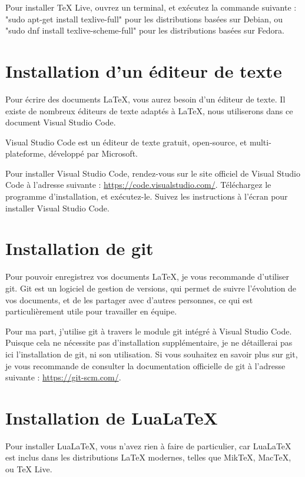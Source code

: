 \documentclass[./main.tex]{subfiles}
\begin{document}
Pour installer TeX Live, ouvrez un terminal, et exécutez la commande suivante :
"sudo apt-get install texlive-full" pour les distributions basées sur Debian, ou "sudo dnf install texlive-scheme-full" pour les distributions basées sur Fedora.

\section{Installation d'un éditeur de texte}

Pour écrire des documents \LaTeX{}, vous aurez besoin d'un éditeur de texte. Il existe de nombreux éditeurs de texte adaptés à \LaTeX{}, nous utiliserons dans ce document Visual Studio Code.

Visual Studio Code est un éditeur de texte gratuit, open-source, et multi-plateforme, développé par Microsoft.

Pour installer Visual Studio Code, rendez-vous sur le site officiel de Visual Studio Code à l'adresse suivante : \url{https://code.visualstudio.com/}. Téléchargez le programme d'installation, et exécutez-le. Suivez les instructions à l'écran pour installer Visual Studio Code.

\section{Installation de git}

Pour pouvoir enregistrez vos documents \LaTeX{}, je vous recommande d'utiliser git. Git est un logiciel de gestion de versions, qui permet de suivre l'évolution de vos documents, et de les partager avec d'autres personnes, ce qui est particulièrement utile pour travailler en équipe.

Pour ma part, j'utilise git à travers le module git intégré à Visual Studio Code. Puisque cela ne nécessite pas d'installation supplémentaire, je ne détaillerai pas ici l'installation de git, ni son utilisation. Si vous souhaitez en savoir plus sur git, je vous recommande de consulter la documentation officielle de git à l'adresse suivante : \url{https://git-scm.com/}.

\section{Installation de Lua\LaTeX{}}

Pour installer Lua\LaTeX{}, vous n'avez rien à faire de particulier, car Lua\LaTeX{} est inclus dans les distributions \LaTeX{} modernes, telles que Mik\TeX{}, Mac\TeX{}, ou TeX Live.
\end{document}
